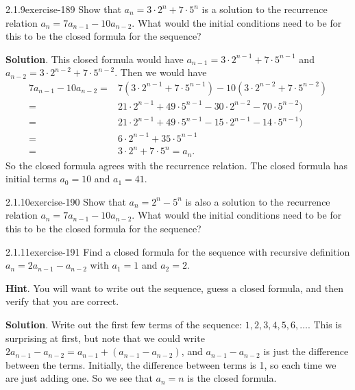 \documentclass[twoside,11pt,]{book}
\numberwithin{equation}{chapter}
\newcommand{\amp}{&}
\begin{document}
\begin{divisionsolution}{2.1.9}{}{exercise-189}%
\hypertarget{p-3031}{}%
Show that \(a_n = 3\cdot 2^n + 7\cdot 5^n\) is a solution to the recurrence relation \(a_n = 7a_{n-1} - 10a_{n-2}\). What would the initial conditions need to be for this to be the closed formula for the sequence?%
\par\smallskip%
\noindent\textbf{Solution}.\quad%
\hypertarget{p-3032}{}%
This closed formula would have \(a_{n-1} = 3\cdot 2^{n-1} + 7 \cdot 5^{n-1}\) and \(a_{n-2} = 3\cdot 2^{n-2} + 7 \cdot 5^{n-2}\). Then we would have%
\begin{align*}
7a_{n-1} - 10a_{n-2} = \amp 7(3\cdot 2^{n-1} + 7 \cdot 5^{n-1}) - 10(3\cdot 2^{n-2} + 7 \cdot 5^{n-2})\\
= \amp 21\cdot 2^{n-1} + 49 \cdot 5^{n-1} - 30\cdot 2^{n-2} - 70 \cdot 5^{n-2})\\
= \amp 21\cdot 2^{n-1} + 49 \cdot 5^{n-1} - 15\cdot 2^{n-1} - 14 \cdot 5^{n-1})\\
= \amp 6\cdot 2^{n-1} + 35 \cdot 5^{n-1}\\
= \amp 3\cdot 2^{n} + 7 \cdot 5^{n} = a_n\text{.}
\end{align*}
So the closed formula agrees with the recurrence relation. The closed formula has initial terms \(a_0 = 10\) and \(a_1 = 41\).%
\end{divisionsolution}%
\begin{divisionsolution}{2.1.10}{}{exercise-190}%
\hypertarget{p-3033}{}%
Show that \(a_n = 2^n - 5^n\) is also a solution to the recurrence relation \(a_n = 7a_{n-1} - 10a_{n-2}\). What would the initial conditions need to be for this to be the closed formula for the sequence?%
\end{divisionsolution}%
\begin{divisionsolution}{2.1.11}{}{exercise-191}%
\hypertarget{p-3034}{}%
Find a closed formula for the sequence with recursive definition \(a_n = 2a_{n-1} - a_{n-2}\) with \(a_1 = 1\) and \(a_2 = 2\).%
\par\smallskip%
\noindent\textbf{Hint}.\quad%
\hypertarget{p-3035}{}%
You will want to write out the sequence, guess a closed formula, and then verify that you are correct.%
\par\smallskip%
\noindent\textbf{Solution}.\quad%
\hypertarget{p-3036}{}%
Write out the first few terms of the sequence: \(1, 2, 3, 4, 5, 6,\ldots\). This is surprising at first, but note that we could write \(2a_{n-1} - a_{n-2} = a_{n-1} + (a_{n-1} -a_{n-2})\), and \(a_{n-1} - a_{n-2}\) is just the difference between the terms. Initially, the difference between terms is 1, so each time we are just adding one. So we see that \(a_n = n\) is the closed formula.%
\end{divisionsolution}%
\end{document}
